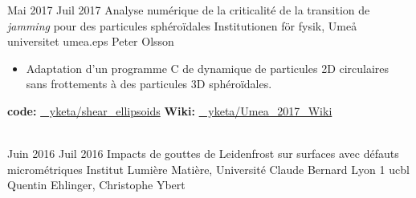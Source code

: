 \documentclass[letterpaper]{cvtemplate_fr} %
\begin{document}
\begin{cvbody}
\cvitem
	{Mai 2017}
	{Juil 2017}
	{Analyse num\'erique de la criticalit\'e de la transition de \textit{jamming} pour des particules sph\'ero\"idales}
	{Institutionen f\"{o}r fysik, Ume\r{a} universitet }
	{umea.eps}
	{Peter Olsson}
	{\begin{itemize}
	\item Adaptation d'un programme C de dynamique de particules 2D circulaires sans frottements \`a des particules 3D sph\'ero\"idales.\\
	\end{itemize}
	{\bf code:} \href{https://github.com/yketa/shear_ellipsoids}{\faGithub~ yketa/shear\_ellipsoids} \hfill {\bf Wiki:} \href{https://github.com/yketa/Umea_2017_Wiki}{\faGithub~ yketa/Umea\_2017\_Wiki}
	}
  \\

\cvitem
	{Juin 2016}
	{Juil 2016}
	{Impacts de gouttes de Leidenfrost sur surfaces avec d\'efauts microm\'etriques}
	{Institut Lumi\`ere Mati\`ere, Universit\'e Claude Bernard Lyon 1 }
	{ucbl}
	{Quentin Ehlinger, Christophe Ybert}

\end{cvbody}

\end{document}
